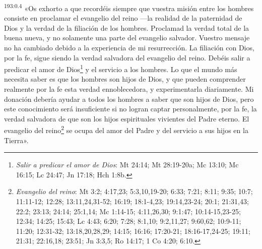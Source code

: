 \par
\textsuperscript{193:0.4} «Os exhorto a que recordéis siempre que vuestra misión entre los hombres consiste en proclamar el evangelio del reino ---la realidad de la paternidad de Dios y la verdad de la filiación de los hombres. Proclamad la verdad total de la buena nueva, y no solamente una parte del evangelio salvador. Vuestro mensaje no ha cambiado debido a la experiencia de mi resurrección. La filiación con Dios, por la fe, sigue siendo la verdad salvadora del evangelio del reino. Debéis salir a predicar el amor de Dios\footnote{\textit{Salir a predicar el amor de Dios}: Mt 24:14; Mt 28:19-20a; Mc 13:10; Mc 16:15; Lc 24:47; Jn 17:18; Hch 1:8b.} y el servicio a los hombres. Lo que el mundo más necesita saber es que los hombres son hijos de Dios, y que pueden comprender realmente por la fe esta verdad ennoblecedora, y experimentarla diariamente. Mi donación debería ayudar a todos los hombres a saber que son hijos de Dios, pero este conocimiento será insuficiente si no logran captar personalmente, por la fe, la verdad salvadora de que son los hijos espirituales vivientes del Padre eterno. El evangelio del reino\footnote{\textit{Evangelio del reino}: Mt 3:2; 4:17,23; 5:3,10,19-20; 6:33; 7:21; 8:11; 9:35; 10:7; 11:11-12; 12:28; 13:11,24,31-52; 16:19; 18:1-4,23; 19:14,23-24; 20:1; 21:31,43; 22:2; 23:13; 24:14; 25:1,14; Mc 1:14-15; 4:11,26,30; 9:1:47; 10:14-15,23-25; 12:34; 14:25; 15:43; Lc 4:43; 6:20; 7:28; 8:1,10; 9:2,11,27; 9:60,62; 10:9-11; 11:20; 12:31-32; 13:18,20,28,29; 14:15; 16:16; 17:20-21; 18:16-17,24-25; 19:11; 21:31; 22:16,18; 23:51; Jn 3:3,5; Ro 14:17; 1 Co 4:20; 6:10.} se ocupa del amor del Padre y del servicio a sus hijos en la Tierra».

